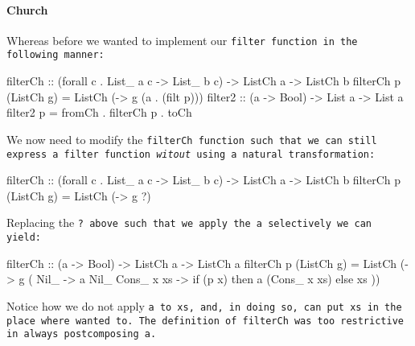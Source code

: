\paragraph{Church}
Whereas before we wanted to implement our \tt{filter} function in the following manner:
\begin{code}
filterCh :: (forall c . List_ a c -> List_ b c) -> ListCh a -> ListCh b
filterCh p (ListCh g) = ListCh (\a -> g (a . (filt p)))
filter2 :: (a -> Bool) -> List a -> List a
filter2 p = fromCh . filterCh p . toCh
\end{code}
We now need to modify the \tt{filterCh} function such that we can still express a filter function \textit{witout} using a natural transformation:
\begin{code}
filterCh :: (forall c . List_ a c -> List_ b c) -> ListCh a -> ListCh b
filterCh p (ListCh g) = ListCh (\a -> g ?)
\end{code}
Replacing the \tt{?} above such that we apply the \tt{a} selectively we can yield:
\begin{code}
filterCh :: (a -> Bool) -> ListCh a -> ListCh a
filterCh p (ListCh g) = ListCh (\a -> g (\case
    Nil_ -> a Nil_
    Cons_ x xs -> if (p x) then a (Cons_ x xs) else xs
  ))
\end{code}
Notice how we do not apply \tt{a} to \tt{xs}, and, in doing so, can put \tt{xs} in the place where wanted to.
The definition of \tt{filterCh} was too restrictive in always postcomposing \tt{a}.





